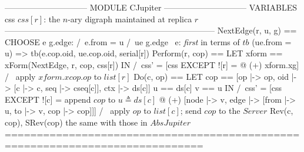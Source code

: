 \documentclass{article}
\begin{document}
\begin{tla}
------------------------------ MODULE CJupiter ------------------------------
VARIABLES css  \* $css[r]$: the $n$-ary digraph maintained at replica $r$
-----------------------------------------------------------------------------
NextEdge(r, u, g) == CHOOSE e \in g.edge:
                       /\ e.from = u
                       /\ \A ue \in g.edge \ {e}: \* \emph{first} in terms of $tb$
                            (ue.from = u) => tb(e.cop.oid, ue.cop.oid, serial[r])
Perform(r, cop) == LET xform == xForm(NextEdge, r, cop, css[r])
                   IN  /\ css' = [css EXCEPT ![r] = @ (+) xform.xg]
                       /\ \* apply $xform.xcop.op$ to $list[r]$
Do(c, op) == LET cop == [op |-> op, oid |-> [c |-> c, seq |-> cseq[c]], ctx |-> ds[c]]
                   u == ds[c]    v == u 
             IN  /\ css' = [css EXCEPT ![c] = \* append $cop$ to $u \triangleq ds[c]$
                    @ (+) [node |-> {v}, edge |-> {[from |-> u, to |-> v, cop |-> cop]}]]
                 /\ \* apply $op$ to $list[c]$; send $cop$ to the $Server$
Rev(c, cop),  SRev(cop) \* the same with those in $AbsJupiter$
=============================================================================
\end{tla}
\end{document}
